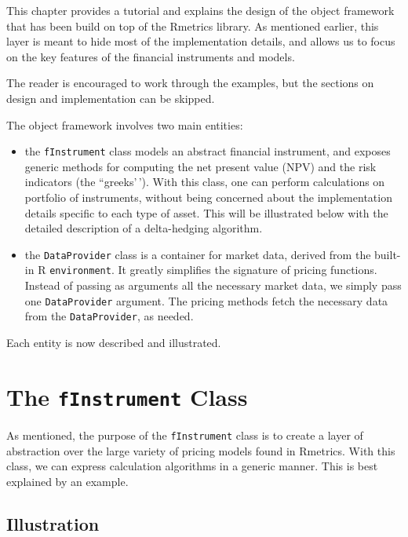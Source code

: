 \documentclass[justified]{tufte-book}
\providecommand{\tightlist}{%
  \setlength{\itemsep}{0pt}\setlength{\parskip}{0pt}}
\newcommand{\RR}{\textsf{R}}
\newcommand{\class}[1]{\texttt{#1}}
\newcommand{\code}[1]{\texttt{#1}\index{#1}}
\begin{document}
This chapter provides a tutorial and explains the design of the object framework that has been build on top of the Rmetrics library.
As mentioned earlier, this layer is meant to hide
most of the implementation details, and allows us to focus on the key features of the
financial instruments and models.

The reader is encouraged to work through the examples, but the sections on design and implementation can be skipped.

The object framework involves two main entities:

\begin{itemize}
\tightlist
\item
  the \class{fInstrument} class models an abstract financial instrument, and exposes
  generic methods for computing the net present value (NPV) and the risk
  indicators (the ``greeks'\,'). With this class, one can perform calculations on portfolio of instruments, without being concerned about the implementation details specific to each type of asset. This will be illustrated below with the detailed description of a delta-hedging algorithm.
\item
  the \class{DataProvider} class is a container for market data, derived from the built-in \RR{} \code{environment}. It greatly simplifies the signature of pricing functions. Instead of passing as arguments all the necessary market data, we simply pass one \class{DataProvider} argument. The pricing methods fetch the necessary data from the \class{DataProvider}, as needed.
\end{itemize}

Each entity is now described and illustrated.

\hypertarget{the-class}{%
\section{\texorpdfstring{The \class{fInstrument} Class}{The  Class}}\label{the-class}}

As mentioned, the purpose of the \class{fInstrument} class is to create a layer of abstraction over the large variety of pricing models found in Rmetrics. With this class, we can express calculation algorithms in a generic manner. This is best explained by an example.

\hypertarget{illustration}{%
\subsection{Illustration}\label{illustration}}
\end{document}
